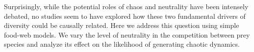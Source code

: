 Surprisingly, while the potential roles of chaos and neutrality have been intensely debated, no studies seem to have explored how these two fundamental drivers of diversity could be causally related. Here we address this question using simple food-web models. We vary the level of neutrality in the competition between prey species and analyze its effect on the likelihood of generating chaotic dynamics.